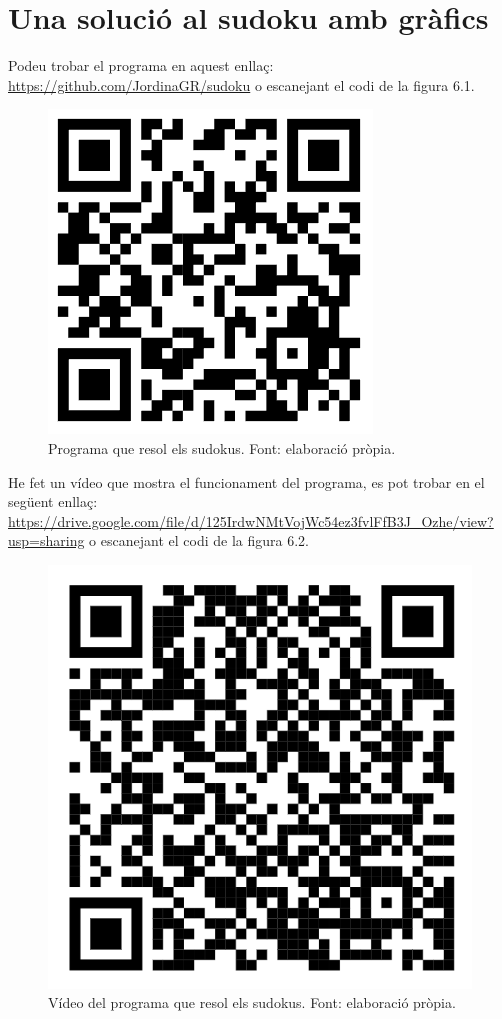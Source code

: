 \section{Una solució al sudoku amb gràfics}
Podeu trobar el programa en aquest enllaç: \url{https://github.com/JordinaGR/sudoku} o escanejant el codi de la figura 6.1.
\begin{figure}[H]
    \centering
    \includegraphics[width=.15\textwidth]{capitols/figures/qr2.png}
    \caption[Programa que resol els sudokus.]{Programa que resol els sudokus. Font: elaboració pròpia.}
    \label{fig:my_label}
\end{figure}

He fet un vídeo que mostra el funcionament del programa, es pot trobar en el següent enllaç: \url{https://drive.google.com/file/d/125IrdwNMtVojWc54ez3fvlFfB3J_Ozhe/view?usp=sharing} o escanejant el codi de la figura 6.2.
\begin{figure}[H]
    \centering
    \includegraphics[width=.15\textwidth]{capitols/figures/10.png}
    \caption[Vídeo del programa que resol els sudokus.]{Vídeo del programa que resol els sudokus. Font: elaboració pròpia.}
    \label{fig:my_label}
\end{figure}

